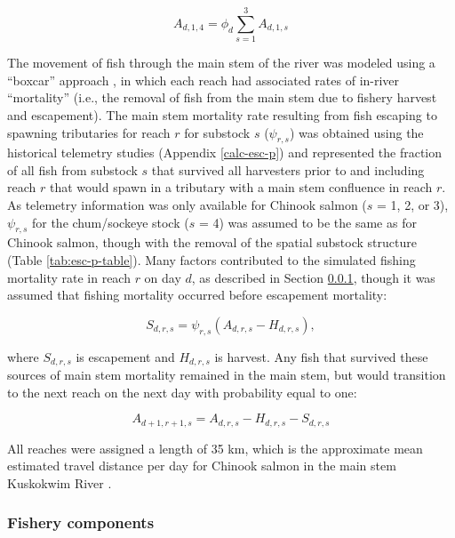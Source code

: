 \documentclass[12pt,]{book}
\theoremstyle{definition}
\theoremstyle{definition}
\theoremstyle{definition}
\theoremstyle{remark}
\begin{document}
\begin{equation}
  A_{d,1,4}=\phi_d \sum_{s=1}^3 A_{d,1,s}
  \label{eq:get-chsk-entry}
\end{equation}

The movement of fish through the main stem of the river was modeled
using a ``boxcar'' approach \citep{walters-martell-2004}, in which each
reach had associated rates of in-river ``mortality'' (i.e., the removal
of fish from the main stem due to fishery harvest and escapement). The
main stem mortality rate resulting from fish escaping to spawning
tributaries for reach \(r\) for substock \(s\) (\(\psi_{r,s}\)) was
obtained using the historical telemetry studies (Appendix
\ref{calc-esc-p}) and represented the fraction of all fish from substock
\(s\) that survived all harvesters prior to and including reach \(r\)
that would spawn in a tributary with a main stem confluence in reach
\(r\). As telemetry information was only available for Chinook salmon
(\(s\) = 1, 2, or 3), \(\psi_{r,s}\) for the chum/sockeye stock (\(s\) =
4) was assumed to be the same as for Chinook salmon, though with the
removal of the spatial substock structure (Table \ref{tab:esc-p-table}).
Many factors contributed to the simulated fishing mortality rate in
reach \(r\) on day \(d\), as described in Section \ref{om-fishery},
though it was assumed that fishing mortality occurred before escapement
mortality:

\begin{equation}
  S_{d,r,s}=\psi_{r,s} \left(A_{d,r,s} - H_{d,r,s} \right),
  \label{eq:get-esc}
\end{equation}

\noindent
where \(S_{d,r,s}\) is escapement and \(H_{d,r,s}\) is harvest. Any fish
that survived these sources of main stem mortality remained in the main
stem, but would transition to the next reach on the next day with
probability equal to one:

\begin{equation}
  A_{d+1,r+1,s}=A_{d,r,s}-H_{d,r,s}-S_{d,r,s}
  \label{eq:move-fish}
\end{equation}

\noindent
All reaches were assigned a length of 35 km, which is the approximate
mean estimated travel distance per day for Chinook salmon in the main
stem Kuskokwim River \citep{smith-liller-2017a, smith-liller-2017b}.

\subsubsection{Fishery components}\label{om-fishery}
\end{document}
